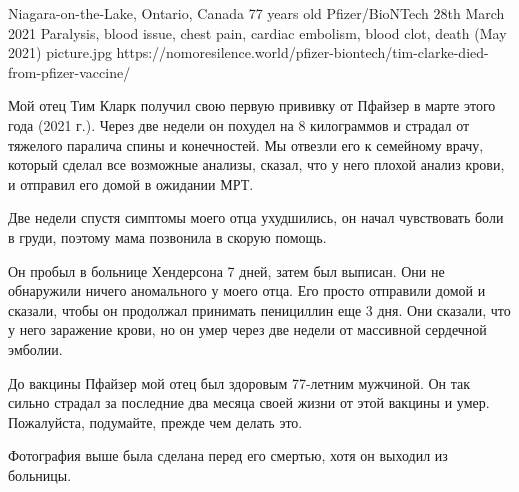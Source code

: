 {Niagara-on-the-Lake, Ontario, Canada}
{77 years old}
{Pfizer/BioNTech}
{28th March 2021}
{Paralysis, blood issue, chest pain, cardiac embolism,  blood clot, death (May 2021)}
{picture.jpg}
{https://nomoresilence.world/pfizer-biontech/tim-clarke-died-from-pfizer-vaccine/}
{

Мой отец Тим Кларк получил свою первую прививку от Пфайзер в марте этого года
(2021 г.). Через две недели он похудел на 8 килограммов и страдал от тяжелого
паралича спины и конечностей. Мы отвезли его к семейному врачу, который сделал
все возможные анализы, сказал, что у него плохой анализ крови, и отправил его
домой в ожидании МРТ.

Две недели спустя симптомы моего отца ухудшились, он начал чувствовать боли в
груди, поэтому мама позвонила в скорую помощь.

Он пробыл в больнице Хендерсона 7 дней, затем был выписан. Они не обнаружили
ничего аномального у моего отца. Его просто отправили домой и сказали, чтобы он
продолжал принимать пенициллин еще 3 дня. Они сказали, что у него заражение
крови, но он умер через две недели от массивной сердечной эмболии.

До вакцины Пфайзер мой отец был здоровым 77-летним мужчиной. Он так сильно
страдал за последние два месяца своей жизни от этой вакцины и умер. Пожалуйста,
подумайте, прежде чем делать это.

Фотография выше была сделана перед его смертью, хотя он выходил из больницы.

}
